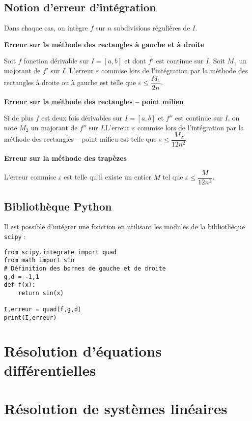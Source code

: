 \subsection*{Notion d'erreur d'intégration}
\begin{resultat}
Dans chaque cas,  on intègre $f$ sur $n$ subdivisions régulières de $I$. 

\textbf{Erreur sur la méthode des rectangles à gauche et à droite}

Soit $f$ fonction dérivable sur $I=[a,b]$ et dont $f'$ est continue sur $I$. Soit $M_1$ un majorant de $f'$ sur $I$. L'erreur $\varepsilon$ commise lors de l'intégration par la méthode des rectangles à droite ou à gauche
 est telle que $ \varepsilon \leq \dfrac{M_1}{2n}$.

\textbf{Erreur sur la méthode des rectangles -- point milieu}

Si de plus $f$ est deux fois dérivables sur $I=[a,b]$ et $f''$ est continue sur $I$, on note $M_2$ un majorant de $f''$ sur $I$.L'erreur $\varepsilon$ commise lors de l'intégration par la méthode des rectangles -- point milieu est telle que $ \varepsilon \leq \dfrac{M_2}{12n^2}$.

\textbf{Erreur sur la méthode des trapèzes}

L'erreur commise $\varepsilon$ est telle qu'il existe un entier $M$ tel que $ \varepsilon \leq \dfrac{M}{12n^2}$.

\end{resultat}

\subsection*{Bibliothèque Python}
Il est possible d'intégrer une fonction en utilisant les modules de la bibliothèque \texttt{scipy} :
\begin{lstlisting}
from scipy.integrate import quad
from math import sin
# Définition des bornes de gauche et de droite
g,d = -1,1 
def f(x):
    return sin(x)
   
I,erreur = quad(f,g,d)
print(I,erreur)
\end{lstlisting}


\section{Résolution d'équations différentielles}

\section{Résolution de systèmes linéaires}
